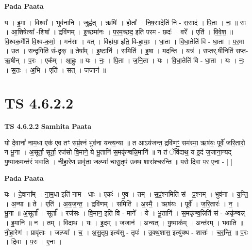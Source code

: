 \documentclass[17pt]{extarticle}
\begin{document}
\textbf{Pada Paata} \newline

य । इ॒मा । विश्वा᳚ । भुव॑नानि । जुह्व॑त् । ऋषिः॑ । होता᳚ । नि॒ष॒सादेति॑ नि - स॒साद॑ । पि॒ता । नः॒ ॥ सः । आ॒शिषेत्या᳚ -शिषा᳚ । द्रवि॑णम् । इ॒च्छमा॑नः । प॒र॒म॒च्छद॒ इति॑ परम - छदः॑ । वरे᳚ । एति॑ । वि॒वे॒श॒ ॥ वि॒श्वक॒र्मेति॑ वि॒श्व-क॒र्मा॒ । मन॑सा । यत् । विहा॑या॒ इति॒ वि-हा॒याः॒ । धा॒ता । वि॒धा॒तेति॑ वि - धा॒ता । प॒र॒मा । उ॒त । स॒न्दृगिति॑ सं-दृक् ॥ तेषा᳚म् । इ॒ष्टानि॑ । समिति॑ । इ॒षा । म॒द॒न्ति॒ । यत्र॑ । स॒प्त॒र्॒.षीनिति॑ सप्त-ऋ॒षीन् । प॒रः । एक᳚म् । आ॒हुः ॥ यः । नः॒ । पि॒ता । ज॒नि॒ता । यः । वि॒धा॒तेति॑ वि - धा॒ता । यः । नः॒ । स॒तः । अ॒भि । एति॑ । सत् । जजान॑ ॥  \newline





\section{ TS 4.6.2.2 }

\textbf{TS 4.6.2.2 } \newline
\textbf{Samhita Paata} \newline

यो दे॒वानां᳚ नाम॒धा एक॑ ए॒व तꣳ स॑प्रं॒श्नं भुव॑ना यन्त्य॒न्या ॥ त आऽय॑जन्त॒ द्रवि॑णꣳ॒॒ सम॑स्मा॒ ऋष॑यः॒ पूर्वे॑ जरि॒तारो॒ न भू॒ना । अ॒सूर्ता॒ सूर्ता॒ रज॑सो वि॒माने॒ ये भू॒तानि॑ स॒मकृ॑ण्वन्नि॒मानि॑ ॥ न तं ॅवि॑दाथ॒ य इ॒दं ज॒जाना॒न्यद् यु॒ष्माक॒मन्त॑रं भवाति । नी॒हा॒रेण॒ प्रावृ॑ता॒ जल्प्या॑ चासु॒तृप॑ उक्थ॒ शास॑श्चरन्ति ॥ प॒रो दि॒वा प॒र ए॒ना - [  ] \newline

\textbf{Pada Paata} \newline

यः । दे॒वाना᳚म् । ना॒म॒धा इति॑ नाम - धाः । एकः॑ । ए॒व । तम् । स॒प्रं॒श्नमिति॑ सं - प्र॒श्नम् । भुव॑ना । य॒न्ति॒ । अ॒न्या ॥ ते । एति॑ । अ॒य॒ज॒न्त॒ । द्रवि॑णम् । समिति॑ । अ॒स्मै॒ । ऋष॑यः । पूर्वे᳚ । ज॒रि॒तारः॑ । न॒ । भू॒ना ॥ अ॒सूर्ता᳚ । सूर्ता᳚ । रज॑सः । वि॒मान॒ इति॑ वि - माने᳚ । ये । भू॒तानि॑ । स॒मकृ॑ण्व॒न्निति॑ सं - अकृ॑ण्वन्न् । इ॒मानि॑ ॥ न । तम् । वि॒दा॒थ॒ । यः । इ॒दम् । ज॒जान॑ । अ॒न्यत् । यु॒ष्माक᳚म् । अन्त॑रम् । भ॒वा॒ति॒ ॥ नी॒हा॒रेण॑ । प्रावृ॑ताः । जल्प्या᳚ । च॒ । अ॒सु॒तृप॒ इत्य॑सु - तृपः॑ । उ॒क्थ॒शास॒ इत्यु॑क्थ - शासः॑ । च॒र॒न्ति॒ ॥ प॒रः । दि॒वा । प॒रः । ए॒ना ।  \newline




\end{document}

